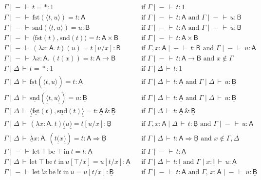 \documentclass{LMCS}
\newcommand{\comptype}[1]{\underline{#1}}
\newcommand{\VA}{\mathsf{A}}
\newcommand{\VB}{\mathsf{B}}
\newcommand{\CA}{\comptype{\mathsf{A}}}
\newcommand{\CB}{\comptype{\mathsf{B}}}
\newcommand{\CI}{\comptype{\mathsf{I}}}
\newcommand{\Vone}{1}
\newcommand{\Vprod}{\times}
\newcommand{\Vfun}{\to}
\newcommand{\Cone}{\comptype{1}}
\newcommand{\Cprod}{\,\&\,}
\newcommand{\Cfun}{\Rightarrow}
\newcommand{\In}[2]{#1 \colon  \! #2}
\newcommand{\rIn}[2]{#1 \colon  #2}
\newcommand{\Cj}[4]{#1 \mid  \! #2 \, \vdash \, \rIn{#3}{#4}}
\newcommand{\Vj}[3]{\Cj{#1}{{-}}{#2}{#3}}
\newcommand{\Ceq}[5]{#1 \mid  \! #2 \, \vdash \, #3 = #4 \colon #5}
\newcommand{\Veq}[4]{\Ceq{#1}{-}{#2}{#3}{#4}}
\newcommand{\Vstar}{{*}}
\newcommand{\Vpair}[2]{\langle #1 , #2 \rangle}
\newcommand{\Vfst}[1]{\mathrm{fst}(#1)}
\newcommand{\Vsnd}[1]{\mathrm{snd}(#1)}
\newcommand{\Vlam}[3]{\lambda \In{#1}{#2}.\: #3}
\newcommand{\Vappl}[2]{#1(#2)}
\newcommand{\compop}[1]{\underline{#1}}
\newcommand{\Cstar}{\compop{*}}
\newcommand{\Cpair}[2]{\compop{\langle} #1 , #2 \compop{\rangle}}
\newcommand{\Cfst}[1]{\compop{\mathrm{fst}}(#1)}
\newcommand{\Csnd}[1]{\compop{\mathrm{snd}}(#1)}
\newcommand{\Clam}[3]{\compop{\lambda} \In{#1}{#2}.\: #3}
\newcommand{\Cappl}[2]{#1\compop{(}#2\compop{)}}
\newcommand{\bang}[1]{{! #1}}
\newcommand{\Itop}{\top}
\newcommand{\Ilet}[2]{\mathrm{let}\: {\Itop}\:\mathrm{be}\:{#1} \;\mathrm{in}\: #2}
\newcommand{\banglet}[3]{\mathrm{let}\: {\bang #1}\:\mathrm{be}\:{#2} \;\mathrm{in}\: #3}
\begin{document}
\begin{figure}  \vspace*{30pt}
\begin{align*}
& \Veq{\Gamma}{t}{\Vstar}{\Vone} & & \text{if $\Vj{\Gamma}{t}{\Vone}$} 
\\
& \Veq{\Gamma}{\Vfst{\Vpair{t}{u}}}{t}{\VA} 
  && \text{if $\Vj{\Gamma}{t}{\VA}$ and $\Vj{\Gamma}{u}{\VB}$} 
\\
& \Veq{\Gamma}{\Vsnd{\Vpair{t}{u}}}{u}{\VB} 
  && \text{if $\Vj{\Gamma}{t}{\VA}$ and $\Vj{\Gamma}{u}{\VB}$} 
\\
& \Veq{\Gamma}{\Vpair{\Vfst{t}}{\Vsnd{t}}}{t}{\VA \Vprod \VB} 
  && \text{if $\Vj{\Gamma}{t}{\VA \Vprod \VB}$}
\\
& \Veq{\Gamma}{\Vappl{(\Vlam{x}{\VA}{t})}{u}}{t[u/x]}{\VB}
  && \text{if $\Vj{\Gamma,\In{x}{\VA}}{t}{\VB}$ and $\Vj{\Gamma}{u}{\VA}$}
\\
& \Veq{\Gamma}{\Vlam{x}{\VA}{(\Vappl{t}{x})}}{t}{\VA \Vfun \VB} 
  && \text{if $\Vj{\Gamma}{t}{\VA \Vfun \VB}$ and $x \not\in \Gamma$}
\\
& \Ceq{\Gamma}{\Delta}{t}{\Cstar}{\Cone} & & \text{if $\Cj{\Gamma}{\Delta}{t}{\Cone}$} 
\\
& \Ceq{\Gamma}{\Delta}{\Cfst{\Cpair{t}{u}}}{t}{\CA} 
  && \text{if $\Cj{\Gamma}{\Delta}{t}{\CA}$ and $\Cj{\Gamma}{\Delta}{u}{\CB}$} 
\\
& \Ceq{\Gamma}{\Delta}{\Csnd{\Cpair{t}{u}}}{u}{\CB} 
  && \text{if $\Cj{\Gamma}{\Delta}{t}{\CA}$ and $\Cj{\Gamma}{\Delta}{u}{\CB}$} 
\\
& \Ceq{\Gamma}{\Delta}{\Cpair{\Cfst{t}}{\Csnd{t}}}{t}{\CA \Cprod \CB} 
  && \text{if $\Cj{\Gamma}{\Delta}{t}{\CA \Cprod \CB}$}
\\
& \Ceq{\Gamma}{\Delta}{\Cappl{(\Clam{x}{\VA}{t})}{u}}{t[u/x]}{\CB}
  && \text{if $\Cj{\Gamma,\In{x}{\VA}}{\Delta}{t}{\CB}$ and $\Vj{\Gamma}{u}{\VA}$}
\\
& \Ceq{\Gamma}{\Delta}{\Clam{x}{\VA}{(\Cappl{t}{x})}}{t}{\VA \Cfun \CB} 
  && \text{if $\Cj{\Gamma}{\Delta}{t}{\VA \Cfun \CB}$ and $x \not\in \Gamma, \Delta$}
\\
& \Veq{\Gamma}{\Ilet{\Itop}{t}}{t}{\CA}
  && \text{if $\Vj{\Gamma}{t}{\CA}$}
\\
& \Ceq{\Gamma}{\Delta}{\Ilet{t}{u[\Itop/x]}}{u[t / x]}{\CA}
  && \text{if $\Cj{\Gamma}{\Delta}{t}{\CI}$ and $\Cj{\Gamma}{\In{x}{\CI}}{u}{\CA}$}
\\
& \Veq{\Gamma}{\banglet{x}{\bang{t}}{u}}{u[t/x]}{\CB}
  && \text{if $\Vj{\Gamma}{t}{\VA}$ and $\Vj{\Gamma,\, \In{x}{\VA}}{u}{\CB}$}
\\

\end{align*}
\end{figure}
\end{document}
